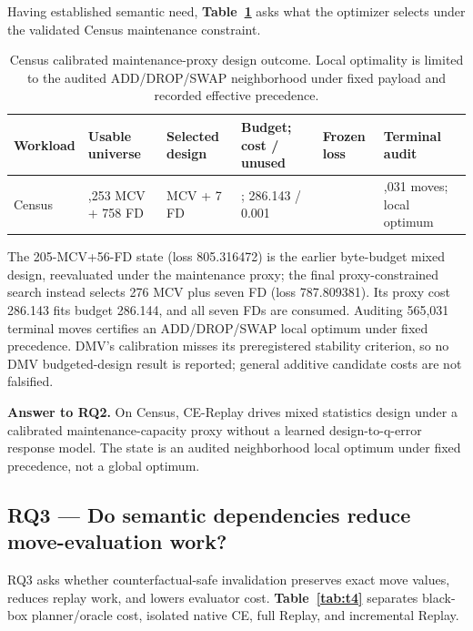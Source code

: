 \documentclass[sigconf,nonacm]{acmart}
\begin{document}
Having established semantic need, \textbf{Table~\ref{tab:t3}} asks what the optimizer selects under the validated Census maintenance constraint.


\begin{table}[t]
\centering
\small
\caption{Census calibrated maintenance-proxy design outcome. Local optimality is limited to the audited ADD/DROP/SWAP neighborhood under fixed payload and recorded effective precedence.}
\label{tab:t3}
\begin{tabularx}{\textwidth}{@{}>{\raggedright\arraybackslash}X>{\raggedright\arraybackslash}X>{\raggedright\arraybackslash}X>{\raggedright\arraybackslash}X>{\raggedright\arraybackslash}X>{\raggedright\arraybackslash}X@{}}
\toprule
Workload & Usable universe & Selected design & Budget; cost / unused & Frozen loss & Terminal audit \\
\midrule
Census & 2,253 MCV + 758 FD & 276 MCV + 7 FD & 286.144; 286.143 / 0.001 & 787.809381 & 565,031 moves; local optimum \\
\bottomrule
\end{tabularx}
\end{table}

The 205-MCV+56-FD state (loss 805.316472) is the earlier byte-budget mixed design, reevaluated under the maintenance proxy; the final proxy-constrained search instead selects 276 MCV plus seven FD (loss 787.809381). Its proxy cost 286.143 fits budget 286.144, and all seven FDs are consumed. Auditing 565,031 terminal moves certifies an ADD/DROP/SWAP local optimum under fixed precedence. DMV's calibration misses its preregistered stability criterion, so no DMV budgeted-design result is reported; general additive candidate costs are not falsified.

\textbf{Answer to RQ2.} On Census, CE-Replay drives mixed statistics design under a calibrated maintenance-capacity proxy without a learned design-to-q-error response model. The state is an audited neighborhood local optimum under fixed precedence, not a global optimum.

\subsection{RQ3 --- Do semantic dependencies reduce move-evaluation work?}

RQ3 asks whether counterfactual-safe invalidation preserves exact move values, reduces replay work, and lowers evaluator cost. \textbf{Table~\ref{tab:t4}} separates black-box planner/oracle cost, isolated native CE, full Replay, and incremental Replay.
\end{document}
